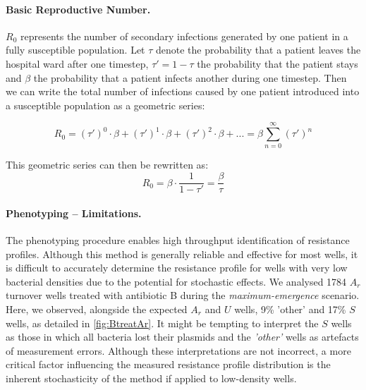 \paragraph{Basic Reproductive Number.}
$R_0$ represents the number of secondary infections generated by one patient in a fully susceptible population. 
Let $\tau$ denote the probability that a patient leaves the hospital ward after one timestep,  $\tau' = 1 - \tau$ the probability that the patient stays and $\beta$ the probability that a patient infects another during one timestep.
Then we can write the total number of infections caused by one patient introduced into a susceptible population as a geometric series:

\begin{equation*}
    R_0 = (\tau')^0 \cdot \beta + (\tau')^1 \cdot \beta + (\tau')^2 \cdot \beta + ... = \beta \sum_{n=0}^{\infty} (\tau')^n
\end{equation*}

This geometric series can then be rewritten as: 
\begin{equation}
    R_0 = \beta \cdot \frac{1}{1 - \tau'} = \frac{\beta}{\tau} \label{eq:R0}
\end{equation}


\paragraph{Phenotyping -- Limitations. \label{par:x_phenotyping}}
The phenotyping procedure enables high throughput identification of resistance profiles. 
Although this method is generally reliable and effective for most wells, it is difficult to accurately determine the resistance profile for wells with very low bacterial densities due to the potential for stochastic effects. 
We analysed 1784 \( A_r \) turnover wells treated with antibiotic B during the \textit{maximum-emergence} scenario. 
Here, we observed, alongside the expected $A_r$ and $U$ wells, 9\% 'other' and 17\% \( S \) wells, as detailed in \autoref{fig:BtreatAr}. 
It might be tempting to interpret the \( S \) wells as those in which all bacteria lost their plasmids and the \textit{'other'} wells as artefacts of measurement errors. 
Although these interpretations are not incorrect, a more critical factor influencing the measured resistance profile distribution is the inherent stochasticity of the method if applied to low-density wells.

